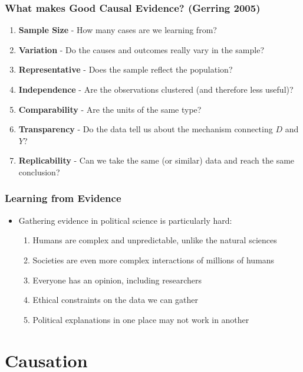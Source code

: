 \documentclass[xcolor=x11names,compress]{beamer}\usepackage[]{graphicx}\usepackage[]{color}
\renewcommand{\(}{\begin{columns}}
\renewcommand{\)}{\end{columns}}
\newcommand{\<}[1]{\begin{column}{#1}}
\renewcommand{\>}{\end{column}}
\begin{document}




\begin{frame}
\frametitle{What makes Good Causal Evidence? (Gerring 2005)}
\begin{enumerate}
\item \textbf{Sample Size} - How many cases are we learning from?
\pause
\item \textbf{Variation} - Do the causes and outcomes really vary in the sample?
\pause
\item \textbf{Representative} - Does the sample reflect the population?
\pause
\item \textbf{Independence} - Are the observations clustered (and therefore less useful)?
\pause
\item \textbf{Comparability} - Are the units of the same type?
\pause
\item \textbf{Transparency} - Do the data tell us about the mechanism connecting $D$ and $Y$?
\pause
\item \textbf{Replicability} - Can we take the same (or similar) data and reach the same conclusion?
\end{enumerate}
\end{frame}

\begin{frame}
\frametitle{Learning from Evidence}
\begin{itemize}
\item Gathering evidence in political science is particularly hard:
\pause
\begin{enumerate}
\item Humans are complex and unpredictable, unlike the natural sciences
\pause
\item Societies are even more complex interactions of millions of humans
\pause
\item Everyone has an opinion, including researchers
\pause
\item Ethical constraints on the data we can gather
\pause
\item Political explanations in one place may not work in another
\end{enumerate}
\end{itemize}
\end{frame}

\section{Causation}
\end{document}
